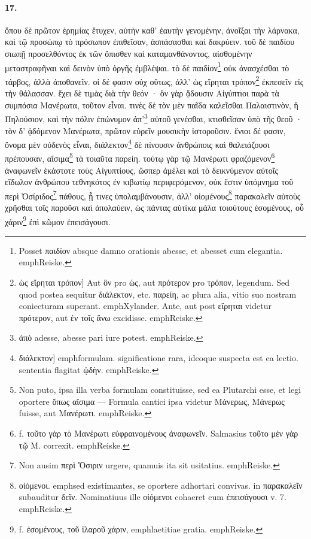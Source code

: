 \documentclass[a4paper, 11pt, oneside, polutonikogreek, german]{article}
\begin{document}
\paragraph{17.}
ὅπου δὲ πρῶτον ἐρημίας ἔτυχεν, αὐτὴν καθ' ἑαυτὴν γενομένην, ἀνοῖξαι τὴν λάρνακα, καὶ τῷ προσώπῳ τὸ πρόσωπον ἐπιθεῖσαν, ἀσπάσασθαι καὶ δακρύειν. τοῦ δὲ παιδίου σιωπῇ προσελθόντος ἐκ τῶν ὄπισθεν καὶ καταμανθάνοντος, αἰσθομένην μεταστραφῆναι καὶ δεινὸν ὑπὸ ὀργῆς ἐμβλέψαι. τὸ δὲ παιδίον\footnote{Posset παιδίον absque damno orationis abesse, et abesset cum elegantia. emph{Reiske.}} οὐκ ἀνασχέσθαι τὸ τάρβος, ἀλλὰ ἀποθανεῖν. οἱ δέ φασιν οὐχ οὕτως, ἀλλ' ὡς εἴρηται τρόπον\footnote{ὡς εἴρηται τρόπον] Aut ὃν pro ὡς, aut πρότερον pro τρόπον, legendum. Sed quod postea sequitur διάλεκτον, etc. παρείη, ac plura alia, vitio suo nostram coniecturam superant. emph{Xylander.} Ante, aut post εἴρηται videtur πρότερον, aut ἐν τοῖς ἂνω excidisse. emph{Reiske.}} ἐκπεσεῖν εἰς τὴν θάλασσαν. ἔχει δὲ τιμὰς διὰ τὴν θεόν · ὃν γὰρ ᾄδουσιν Αἰγύπτιοι παρὰ τὰ συμπόσια Μανέρωτα, τοῦτον εἶναι. τινὲς δὲ τὸν μὲν παῖδα καλεῖσθαι Παλαιστινὸν, ἢ Πηλούσιον, καὶ τὴν πόλιν ἐπώνυμον ἀπ'\footnote{ἀπὸ adesse, abesse pari iure potest. emph{Reiske.}} αὐτοῦ γενέσθαι, κτισθεῖσαν ὑπὸ τῆς θεοῦ · τὸν δ' ᾀδόμενον Μανέρωτα, πρῶτον εὑρεῖν μουσικὴν ἱστοροῦσιν. ἔνιοι δέ φασιν, ὄνομα μὲν οὐδενὸς εἶναι, διάλεκτον\footnote{διάλεκτον] emph{formulam.} significatione rara, ideoque suspecta est ea lectio. sententia flagitat ᾠδὴν. emph{Reiske.}} δὲ πίνουσιν ἀνθρώποις καὶ θαλειάζουσι πρέπουσαν, αἴσιμα\footnote{Non puto, ipsa illa verba formulam constituisse, sed ea Plutarchi esse, et legi oportere ὅπως αἴσιμα --- Formula cantici ipsa videtur Μάνερως, Μάνερως fuisse, aut Μανέρωτι. emph{Reiske.}} τὰ τοιαῦτα παρείη. τούτῳ γὰρ τῷ Μανέρωτι φραζόμενον\footnote{f. τοῦτο γὰρ τὸ Μανέρωτι εὐφραινομένους ἀναφωνεῖν. Salmasius τοῦτο μὲν γὰρ τῷ Μ. correxit. emph{Reiske.}} ἀναφωνεῖν ἑκάστοτε τοὺς Αἰγυπτίους, ὥσπερ ἀμέλει καὶ τὸ δεικνύμενον αὐτοῖς εἴδωλον ἀνθρώπου τεθνηκότος ἐν κιβωτίῳ περιφερόμενον, οὐκ ἔστιν ὑπόμνημα τοῦ περὶ Ὀσίριδος\footnote{Non ausim περὶ Ὄσιριν urgere, quamuis ita sit usitatius. emph{Reiske.}} πάθους, ᾗ τινες ὑπολαμβάνουσιν, ἀλλ' οἰομένους\footnote{οἰόμενοι. emph{sed existimantes, se oportere adhortari convivas.} in παρακαλεῖν subauditur δεῖν. Nominatiuus ille οἰόμενοι cohaeret cum ἐπεισάγουσι v. 7. emph{Reiske.}} παρακαλεῖν αὑτοὺς χρῆσθαι τοῖς παροῦσι καὶ ἀπολαύειν, ὡς πάντας αὐτίκα μάλα τοιούτους ἐσομένους, οὗ χάριν\footnote{f. ἐσομένους, τοῦ ἱλαροῦ χάριν, emph{laetitiae gratia.} emph{Reiske.}} ἐπὶ κῶμον ἐπεισάγουσι.
\end{document}
